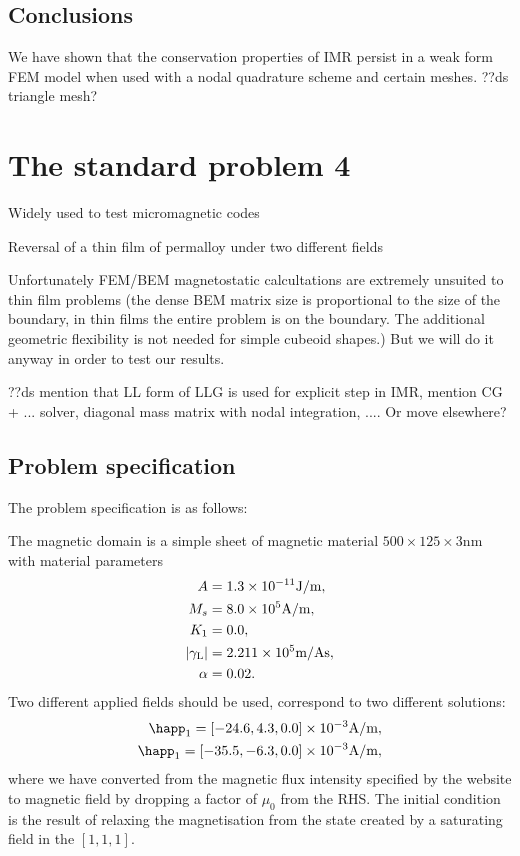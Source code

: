 \subsection{Conclusions}

We have shown that the conservation properties of IMR persist in a weak form FEM model when used with a nodal quadrature scheme and certain meshes.
??ds triangle mesh?



\section{The \mumag standard problem 4}

Widely used to test micromagnetic codes

Reversal of a thin film of permalloy under two different fields

Unfortunately FEM/BEM magnetostatic calcultations are extremely unsuited to thin film problems (the dense BEM matrix size is proportional to the size of the boundary, in thin films the entire problem is on the boundary. The additional geometric flexibility is not needed for simple cubeoid shapes.)
But we will do it anyway in order to test our results.

??ds mention that LL form of LLG is used for explicit step in IMR, mention CG + ... solver, diagonal mass matrix with nodal integration, .... Or move elsewhere?


\subsection{Problem specification}

The problem specification is as follows:

The magnetic domain is a simple sheet of magnetic material $500 \times 125 \times 3$nm with material parameters
\begin{equation}
  \begin{aligned}
    A &= 1.3\times 10^{-11} \text{J/m}, \\
    M_s &= 8.0\times 10^{5} \text{A/m}, \\
    K_1 &= 0.0, \\
    {\left|{\gamma_{\mathrm{\tiny{L}}}} \right|} &= 2.211 \times 10^{5} \text{m/As}, \\
    \alpha &= 0.02.
  \end{aligned}
\end{equation}
Two different applied fields should be used, correspond to two different solutions:
\begin{equation}
  \begin{aligned}
    \happ_1 = [-24.6, 4.3, 0.0] \E{-3}\text{A/m}, \\
    \happ_1 = [-35.5, -6.3, 0.0] \E{-3}\text{A/m}, \\
  \end{aligned}
  \label{eq:mumag-h-app}
\end{equation}
where we have converted from the magnetic flux intensity specified by the \mumag website to magnetic field by dropping a factor of $\mu_0$ from the RHS.
The initial condition is the result of relaxing the magnetisation from the state created by a saturating field in the $[1,1,1]$.

